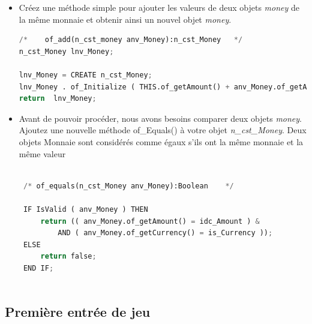 \documentclass[french]{article}
\theoremstyle{definition}
\begin{document}
\begin{itemize}
\begin{lstlisting}[language=Python, caption=accesseur pour recuperer la monnaie de l'objet \textit{money}]
\end{lstlisting}
\item  Créez une méthode simple pour ajouter les valeurs de deux objets \textit{money} de la même monnaie et obtenir ainsi un nouvel objet \textit{money}.
\begin{lstlisting}[language=Python, caption=Simple addition de deux montants de la même monnaie]
  /*	of_add(n_cst_money anv_Money):n_cst_Money	*/
n_cst_Money	lnv_Money;

lnv_Money = CREATE n_cst_Money;
lnv_Money . of_Initialize ( THIS.of_getAmount() + anv_Money.of_getAmount(), THIS.of_getCurrency( ));
return	lnv_Money;

\end{lstlisting}
\item Avant de pouvoir procéder, nous avons besoins comparer deux objets \textit{money}.  
Ajoutez une nouvelle méthode of\_Equals() à votre objet \textit{n\_cst\_Money}.
 Deux objets Monnaie sont considérés comme égaux s'ils ont la même monnaie et la même valeur
 
 \begin{lstlisting}[language=Python, caption=Comparaison de deux objets \textit{money}]

 /*	of_equals(n_cst_Money anv_Money):Boolean	*/

 IF IsValid ( anv_Money ) THEN
     return (( anv_Money.of_getAmount() = idc_Amount ) &
         AND ( anv_Money.of_getCurrency() = is_Currency ));
 ELSE
     return false;
 END IF;
 
\end{lstlisting}
\end{itemize}

\subsection{Première entrée de jeu}
\end{document}
